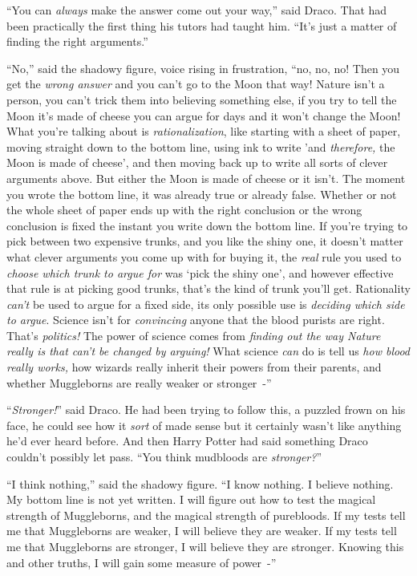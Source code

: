``You can \emph{always} make the answer come out your way,'' said Draco. That had been practically the first thing his tutors had taught him. ``It's just a matter of finding the right arguments.''

``No,'' said the shadowy figure, voice rising in frustration, ``no, no, no! Then you get the \emph{wrong answer} and you can't go to the Moon that way! Nature isn't a person, you can't trick them into believing something else, if you try to tell the Moon it's made of cheese you can argue for days and it won't change the Moon! What you're talking about is \emph{rationalization}, like starting with a sheet of paper, moving straight down to the bottom line, using ink to write 'and \emph{therefore,} the Moon is made of cheese', and then moving back up to write all sorts of clever arguments above. But either the Moon is made of cheese or it isn't. The moment you wrote the bottom line, it was already true or already false. Whether or not the whole sheet of paper ends up with the right conclusion or the wrong conclusion is fixed the instant you write down the bottom line. If you're trying to pick between two expensive trunks, and you like the shiny one, it doesn't matter what clever arguments you come up with for buying it, the \emph{real} rule you used to \emph{choose which trunk to argue for} was `pick the shiny one', and however effective that rule is at picking good trunks, that's the kind of trunk you'll get. Rationality \emph{can't} be used to argue for a fixed side, its only possible use is \emph{deciding which side to argue}. Science isn't for \emph{convincing} anyone that the blood purists are right. That's \emph{politics!} The power of science comes from \emph{finding out the way Nature really is that can't be changed by arguing!} What science \emph{can} do is tell us \emph{how blood really works,} how wizards really inherit their powers from their parents, and whether Muggleborns are really weaker or stronger~-''

``\emph{Stronger!}'' said Draco. He had been trying to follow this, a puzzled frown on his face, he could see how it \emph{sort} of made sense but it certainly wasn't like anything he'd ever heard before. And then Harry Potter had said something Draco couldn't possibly let pass. ``You think mudbloods are \emph{stronger?}''

``I think nothing,'' said the shadowy figure. ``I know nothing. I believe nothing. My bottom line is not yet written. I will figure out how to test the magical strength of Muggleborns, and the magical strength of purebloods. If my tests tell me that Muggleborns are weaker, I will believe they are weaker. If my tests tell me that Muggleborns are stronger, I will believe they are stronger. Knowing this and other truths, I will gain some measure of power~-''


